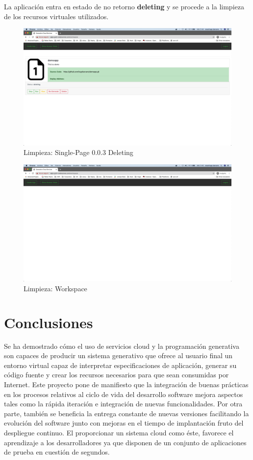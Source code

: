 \documentclass[a4paper,11pt]{book}
\begin{document}
La aplicación entra en estado de no retorno \textbf{deleting} y se procede  a la limpieza de los recursos virtuales utilizados. 

   \begin{figure}[H]
\centering
\includegraphics[scale=0.2]{imagenes/casouso/5_2.png}
\caption{  Limpieza: Single-Page 0.0.3 Deleting }
\end{figure}

   \begin{figure}[H]
\centering
\includegraphics[scale=0.2]{imagenes/casouso/5_3.png}
\caption{ Limpieza: Workspace  }
\end{figure}


\chapter{Conclusiones}

Se ha demostrado cómo el uso de servicios cloud y la programación generativa son capaces de producir un sistema generativo que ofrece al usuario final un entorno virtual capaz de interpretar especificaciones de aplicación, generar su código fuente y crear los recursos necesarios para que sean consumidas por Internet.   Este proyecto pone de manifiesto que la integración de buenas prácticas en los procesos relativos al ciclo de vida del desarrollo software mejora aspectos tales como la rápida iteración e integración  de nuevas funcionalidades. Por otra parte, también se beneficia la entrega constante de nuevas versiones facilitando la evolución del software junto con mejoras en el tiempo de implantación fruto del despliegue continuo. El proporcionar un sistema cloud como éste, favorece el aprendizaje a los desarrolladores ya que disponen de un conjunto de aplicaciones de prueba en cuestión de segundos.  
\end{document}
